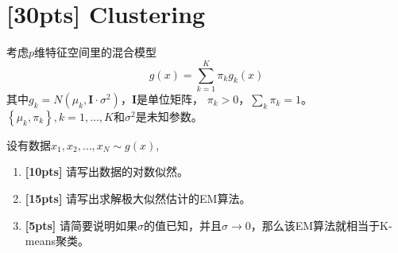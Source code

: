 \documentclass[a4paper,UTF8]{article}
\theoremstyle{definition}
\begin{document}
\section{[30pts] Clustering}
考虑$p$维特征空间里的混合模型
$$
	g(x)=\sum_{k=1}^{K} \pi_{k} g_{k}(x)
$$
其中$g_{k}=N\left(\mu_{k}, \mathbf{I} \cdot \sigma^{2}\right)$，$\mathbf{I}$是单位矩阵，
$\pi_{k} > 0$，$\sum_{k} \pi_{k}=1$。
$\left\{\mu_{k}, \pi_{k}\right\}, k=1,\ldots,K$和$\sigma^2$是未知参数。

设有数据$x_{1}, x_{2}, \ldots, x_{N} \sim g(x)$,
\begin{enumerate}
	\item \textbf{[10pts]} 请写出数据的对数似然。
	\item \textbf{[15pts]} 请写出求解极大似然估计的EM算法。
	\item \textbf{[5pts]} 请简要说明如果$\sigma$的值已知，并且$\sigma \rightarrow 0$，那么该EM算法就相当于K-means聚类。
\end{enumerate}
\end{document}
